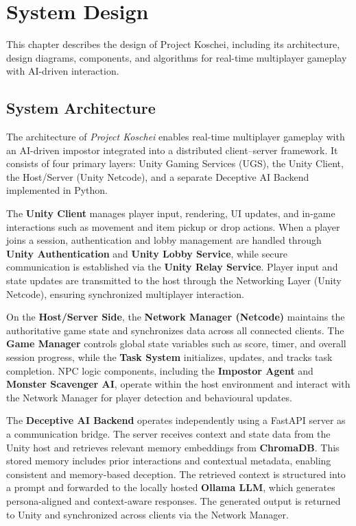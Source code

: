 \chapter{System Design}

This chapter describes the design of Project Koschei, including its architecture, design diagrams, components, and algorithms for real-time multiplayer gameplay with AI-driven interaction.

\section{System Architecture}

The architecture of \textit{Project Koschei} enables real-time multiplayer gameplay with an AI-driven impostor integrated into a distributed client--server framework.
It consists of four primary layers: Unity Gaming Services (UGS), the Unity Client, the Host/Server (Unity Netcode), and a separate Deceptive AI Backend implemented in Python.

The \textbf{Unity Client} manages player input, rendering, UI updates, and in-game interactions such as movement and item pickup or drop actions.
When a player joins a session, authentication and lobby management are handled through \textbf{Unity Authentication} and \textbf{Unity Lobby Service}, while secure communication is established via the \textbf{Unity Relay Service}.
Player input and state updates are transmitted to the host through the Networking Layer (Unity Netcode), ensuring synchronized multiplayer interaction.

On the \textbf{Host/Server Side}, the \textbf{Network Manager (Netcode)} maintains the authoritative game state and synchronizes data across all connected clients.
The \textbf{Game Manager} controls global state variables such as score, timer, and overall session progress, while the \textbf{Task System} initializes, updates, and tracks task completion.
NPC logic components, including the \textbf{Impostor Agent} and \textbf{Monster Scavenger AI}, operate within the host environment and interact with the Network Manager for player detection and behavioural updates.

The \textbf{Deceptive AI Backend} operates independently using a FastAPI server as a communication bridge.
The server receives context and state data from the Unity host and retrieves relevant memory embeddings from \textbf{ChromaDB}.
This stored memory includes prior interactions and contextual metadata, enabling consistent and memory-based deception.
The retrieved context is structured into a prompt and forwarded to the locally hosted \textbf{Ollama LLM}, which generates persona-aligned and context-aware responses.
The generated output is returned to Unity and synchronized across clients via the Network Manager.

